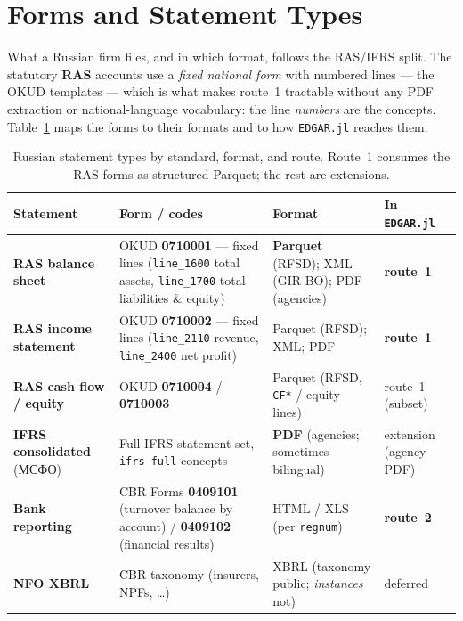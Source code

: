 \documentclass[11pt,a4paper]{report}
\newcommand{\rus}[1]{{\rusfont #1}}
\begin{document}
\section{Forms and Statement Types}\label{sec:russia-forms}

What a Russian firm files, and in which format, follows the RAS/IFRS split. The statutory \textbf{RAS} accounts
use a \emph{fixed national form} with numbered lines --- the OKUD templates --- which is what makes route~1
tractable without any PDF extraction or national-language vocabulary: the line \emph{numbers} are the
concepts. Table~\ref{tab:russia-forms} maps the forms to their formats and to how \texttt{EDGAR.jl} reaches
them.

\begin{table}[h]
\centering
\small
\caption{Russian statement types by standard, format, and route. Route~1 consumes the RAS forms as structured
Parquet; the rest are extensions.}
\label{tab:russia-forms}
\begin{tabular}{@{}p{}p{}p{}p{}@{}}
\toprule
\textbf{Statement} & \textbf{Form / codes} & \textbf{Format} & \textbf{In \texttt{EDGAR.jl}} \\
\midrule
\textbf{RAS balance sheet} & OKUD \textbf{0710001} --- fixed lines (\texttt{line\_1600} total assets,
  \texttt{line\_1700} total liabilities \& equity) & \textbf{Parquet} (RFSD); XML (GIR BO); PDF (agencies) &
  \textbf{route~1} \\
\textbf{RAS income statement} & OKUD \textbf{0710002} --- fixed lines (\texttt{line\_2110} revenue,
  \texttt{line\_2400} net profit) & Parquet (RFSD); XML; PDF & \textbf{route~1} \\
\textbf{RAS cash flow / equity} & OKUD \textbf{0710004} / \textbf{0710003} & Parquet (RFSD, \texttt{CF*} /
  equity lines) & route~1 (subset) \\
\textbf{IFRS consolidated} (\rus{МСФО}) & Full IFRS statement set, \texttt{ifrs-full} concepts & \textbf{PDF}
  (agencies; sometimes bilingual) & extension (agency PDF) \\
\textbf{Bank reporting} & CBR Forms \textbf{0409101} (turnover balance by account) / \textbf{0409102}
  (financial results) & HTML / XLS (per \texttt{regnum}) & \textbf{route~2} \\
\textbf{NFO XBRL} & CBR taxonomy (insurers, NPFs, \ldots) & XBRL (taxonomy public; \emph{instances} not) &
  deferred \\
\bottomrule
\end{tabular}
\end{table}
\end{document}
